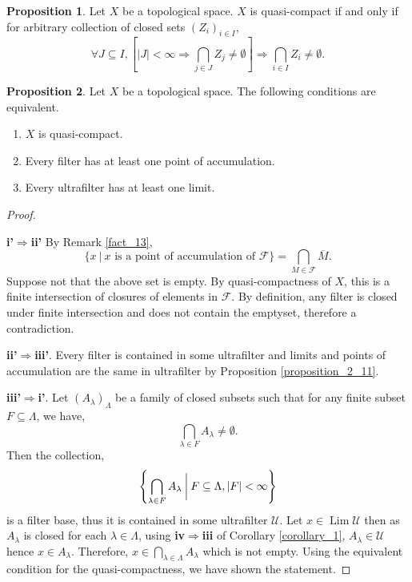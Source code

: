 \documentclass[10pt]{article}
\numberwithin{equation}{section}
\theoremstyle{definition}
\newtheorem{proposition}{Proposition}[subsection]
\DeclareMathOperator{\Lim}{Lim}
\newcommand{\F}[0]{\mathcal{F}}
\newcommand{\U}[0]{\mathcal{U}}
\newcommand{\sep}[0]{\:|\:}
\begin{document}
\begin{proposition}
    Let $X$ be a topological space. $X$ is quasi-compact if and only if for arbitrary collection of closed sets $(Z_i)_{i\in I}$,
    \begin{equation*}
        \forall J\subseteq I, \left[\vert J\vert<\infty\Rightarrow \bigcap_{j\in J}Z_j\not=\emptyset\right]\Rightarrow \bigcap_{i\in I}Z_i\not=\emptyset.
    \end{equation*}
\end{proposition}
\begin{proposition}
    \label{proposition_2_another}
    Let $X$ be a topological space. The following conditions are equivalent.
    \begin{enumerate}[i'.]
        \item $X$ is quasi-compact.
        \item Every filter has at least one point of accumulation.
        \item Every ultrafilter has at least one limit.
    \end{enumerate}
\end{proposition}
\begin{proof}$\:$
    \par\textbf{i'}$\Rightarrow$\textbf{ii'} By Remark \ref{fact_13},
    \begin{equation*}
        \{x\sep x\text{ is a point of accumulation of $\F$}\} = \bigcap_{M\in\F}\overline{M}.
    \end{equation*}
    Suppose not that the above set is empty. By quasi-compactness of $X$, this is a finite intersection of closures of elements in $\F$. By definition, any filter is closed under finite intersection and does not contain the emptyset, therefore a contradiction.
    \par\textbf{ii'}$\Rightarrow$\textbf{iii'}. Every filter is contained in some ultrafilter and limits and points of accumulation are the same in ultrafilter by Proposition \ref{proposition_2_11}.
    \par\textbf{iii'}$\Rightarrow$\textbf{i'}. Let $(A_\lambda)_\Lambda$ be a family of closed subsets such that for any finite subset $F\subseteq\Lambda$, we have,
    \begin{equation*}
        \bigcap_{\lambda\in F}A_\lambda\not=\emptyset.
    \end{equation*}
    Then the collection,
    \begin{equation*}
        \left\{\bigcap_{\lambda\in F}A_\lambda\:\bigg{|}\: F\subseteq\Lambda,\vert F\vert<\infty\right\}
    \end{equation*}
    is a filter base, thus it is contained in some ultrafilter $\U$. Let $x\in\Lim\U$ then as $A_\lambda$ is closed for each $\lambda\in \Lambda$, using \textbf{iv}$\Rightarrow$\textbf{iii} of Corollary \ref{corollary_1}, $A_\lambda\in\U$ hence $x\in A_\lambda$. Therefore, $x\in\bigcap_{\lambda\in\Lambda}A_\lambda$ which is not empty.
    Using the equivalent condition for the quasi-compactness, we have shown the statement.
\end{proof}
\end{document}
